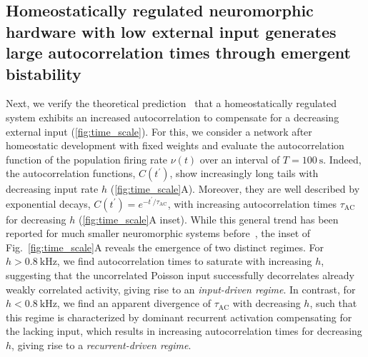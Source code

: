 \subsection{Homeostatically regulated neuromorphic hardware with low external input generates large autocorrelation times through emergent bistability}

Next, we verify the theoretical prediction~\cite{zierenberg_homeostatic_2018} that a homeostatically regulated system exhibits an increased autocorrelation to compensate for a decreasing external input (\cref{fig:time_scale}).
For this, we consider a network after homeostatic development with fixed weights and evaluate the autocorrelation function of the population firing rate $\nu(t)$ over an interval of $T=\SI{100}{\second}$.
Indeed, the autocorrelation functions, $C(t^\prime)$, show increasingly long tails with decreasing input rate $h$ (\cref{fig:time_scale}A).
Moreover, they are well described by exponential decays, $C(t^\prime)=e^{-t^\prime/\tau_\mathrm{AC}}$, with increasing autocorrelation times $\tau_\mathrm{AC}$ for decreasing $h$ (\cref{fig:time_scale}A inset).
While this general trend has been reported for much smaller neuromorphic systems before~\cite{cramer_control_2020}, the inset of Fig.~\ref{fig:time_scale}A reveals the emergence of two distinct regimes.
For $h>\SI{0.8}{\kilo\hertz}$, we find autocorrelation times to saturate with increasing $h$, suggesting that the uncorrelated Poisson input successfully decorrelates already weakly correlated activity, giving rise to an \textit{input-driven regime}.
In contrast, for $h<\SI{0.8}{\kilo\hertz}$, we find an apparent divergence of $\tau_\mathrm{AC}$ with decreasing $h$, such that this regime is characterized by dominant recurrent activation compensating for the lacking input, which results in increasing autocorrelation times for decreasing $h$, giving rise to a \textit{recurrent-driven regime}.

